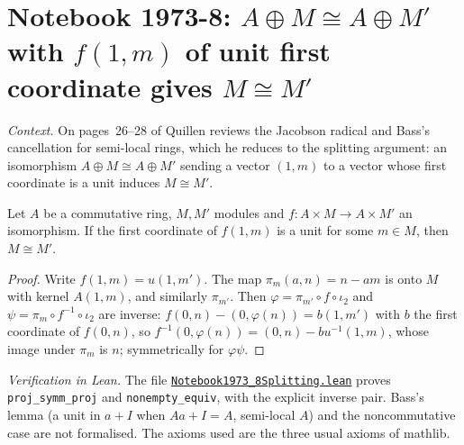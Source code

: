 \section[Notebook 1973-8: cancelling a free summand along a unimodular vector]{Notebook 1973-8: $A \oplus M \cong A \oplus M'$ with $f(1, m)$ of unit first coordinate gives $M \cong M'$\protect{}}\label{sec:quillen-1973-8-splitting}

\emph{Context.} On pages~26--28 of  Quillen reviews the Jacobson radical and Bass's cancellation for semi-local rings, which he reduces to the splitting argument: an isomorphism $A \oplus M \cong A \oplus M'$ sending a vector $(1, m)$ to a vector whose first coordinate is a unit induces $M \cong M'$.

\begin{encadre}
\begin{theoreme}\label{thm:quillen-1973-8-splitting}
Let $A$ be a commutative ring, $M, M'$ modules and $f : A \times M \to A \times M'$ an isomorphism. If the first coordinate of $f(1, m)$ is a unit for some $m \in M$, then $M \cong M'$.
\end{theoreme}
\end{encadre}

\begin{proof}
Write $f(1, m) = u(1, m')$. The map $\pi_m(a, n) = n - am$ is onto $M$ with kernel $A(1, m)$, and similarly $\pi_{m'}$. Then $\varphi = \pi_{m'} \circ f \circ \iota_2$ and $\psi = \pi_m \circ f^{-1} \circ \iota_2$ are inverse: $f(0, n) - (0, \varphi(n)) = b(1, m')$ with $b$ the first coordinate of $f(0, n)$, so $f^{-1}(0, \varphi(n)) = (0, n) - bu^{-1}(1, m)$, whose image under $\pi_m$ is $n$; symmetrically for $\varphi\psi$.
\end{proof}

\emph{Verification in Lean.} The file \href{\leanblobmain/Notebook1973_8Splitting.lean}{\texttt{Notebook1973\_8Splitting.\allowbreak{}lean}} proves \texttt{proj\_symm\_proj} and \texttt{nonempty\_equiv}, with the explicit inverse pair. Bass's lemma (a unit in $a + I$ when $Aa + I = A$, semi-local $A$) and the noncommutative case are not formalised. The axioms used are the three usual axioms of mathlib.

